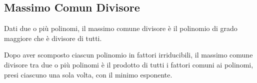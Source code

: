 \subsection{Massimo Comun Divisore}

\begin{definizione}{}{}
Dati due o più polinomi, il massimo comune divisore è il polinomio 
di grado maggiore che è divisore di tutti.
\end{definizione}

% 


\begin{teorema}{}{}
Dopo aver scomposto ciascun polinomio in fattori irriducibili, il massimo 
comune divisore tra due o più polinomi è il prodotto di tutti i fattori 
comuni ai polinomi, presi ciascuno una sola volta, con il minimo esponente.
\end{teorema}



